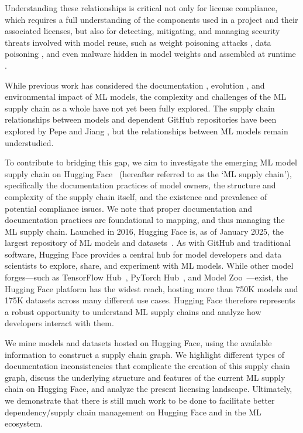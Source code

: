 Understanding these relationships is critical not only for license compliance, which requires a full understanding of the components used in a project and their associated licenses, but also for detecting, mitigating, and managing security threats involved with model reuse, such as weight poisoning attacks \cite{Kurita2020WeightPA}, data poisoning \cite{Goldblum2020DatasetSF}, and even malware hidden in model weights and assembled at runtime \cite{Wang2021EvilModelHM}.

 While previous work has considered the documentation \cite{pepe2024hugging}, evolution \cite{jiang2022empirical}, and environmental impact \cite{castano2024lessons} of ML models, the complexity and challenges of the ML supply chain as a whole have not yet been fully explored. The supply chain relationships between models and dependent GitHub repositories have been explored by Pepe \etal \cite{pepe2024hugging} and Jiang \etal \cite{jiang2024peatmoss}, %
 but the relationships between ML models remain understudied.


To contribute to bridging this gap, we aim to investigate the emerging ML model supply chain on Hugging Face~\cite{hugging-face} (hereafter referred to as the `ML supply chain'), specifically the documentation practices of model owners, the structure and complexity of the supply chain itself, and the existence and prevalence of potential compliance issues. We note that proper documentation and documentation practices are foundational to mapping, and thus managing the ML supply chain.  Launched in 2016, Hugging Face is, as of January 2025, the largest repository of ML models and datasets~\cite{Jiang2023AnES, jiang2022empirical}. As with GitHub and traditional software, Hugging Face provides a central hub for model developers and data scientists to explore, share, and experiment with ML models.  While other model forges---such as TensorFlow Hub~\cite{tensorflowHub}, PyTorch Hub~\cite{pytorchHub}, and Model Zoo~\cite{modelzoo}---exist, the Hugging Face platform has the widest reach, hosting more than 750K models and 175K datasets across many different use cases. Hugging Face therefore represents a robust opportunity to understand ML supply chains and analyze how developers interact with them.

We mine models and datasets hosted on Hugging Face, using the available information to construct a supply chain graph.  %
We highlight different types of documentation inconsistencies that complicate the creation of this supply chain graph, discuss the underlying structure and features of the current ML supply chain on Hugging Face, and analyze the present licensing landscape. Ultimately, we demonstrate that there is still much work to be done to facilitate better dependency/supply chain management on Hugging Face and in the ML ecosystem. %

